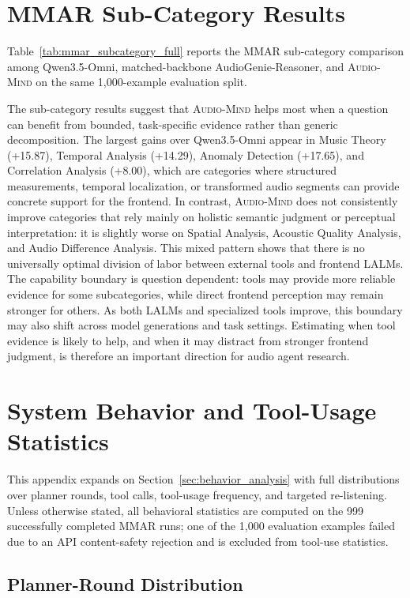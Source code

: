 \documentclass[11pt]{article}
\newcommand{\ours}{\textsc{Audio-Mind}}
\begin{document}
\section{MMAR Sub-Category Results}
\label{sec:mmar_subcategory_appendix}

Table~\ref{tab:mmar_subcategory_full} reports the MMAR sub-category comparison among Qwen3.5-Omni, matched-backbone AudioGenie-Reasoner, and \ours{} on the same 1,000-example evaluation split.

The sub-category results suggest that \ours{} helps most when a question can benefit from bounded, task-specific evidence rather than generic decomposition. The largest gains over Qwen3.5-Omni appear in Music Theory (+15.87), Temporal Analysis (+14.29), Anomaly Detection (+17.65), and Correlation Analysis (+8.00), which are categories where structured measurements, temporal localization, or transformed audio segments can provide concrete support for the frontend. In contrast, \ours{} does not consistently improve categories that rely mainly on holistic semantic judgment or perceptual interpretation: it is slightly worse on Spatial Analysis, Acoustic Quality Analysis, and Audio Difference Analysis. This mixed pattern shows that there is no universally optimal division of labor between external tools and frontend LALMs. The capability boundary is question dependent: tools may provide more reliable evidence for some subcategories, while direct frontend perception may remain stronger for others. As both LALMs and specialized tools improve, this boundary may also shift across model generations and task settings. Estimating when tool evidence is likely to help, and when it may distract from stronger frontend judgment, is therefore an important direction for audio agent research.

\section{System Behavior and Tool-Usage Statistics}
\label{sec:behavior_appendix}

This appendix expands on Section~\ref{sec:behavior_analysis} with full distributions over planner rounds, tool calls, tool-usage frequency, and targeted re-listening. Unless otherwise stated, all behavioral statistics are computed on the 999 successfully completed MMAR runs; one of the 1,000 evaluation examples failed due to an API content-safety rejection and is excluded from tool-use statistics.
\subsection{Planner-Round Distribution}
\end{document}
